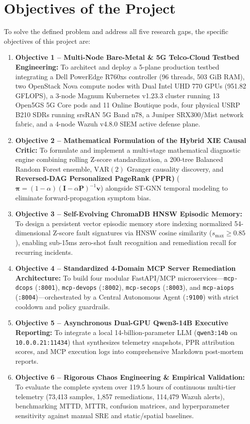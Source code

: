 \section{Objectives of the Project}
To solve the defined problem and address all five research gaps, the specific objectives of this project are:
\begin{enumerate}
    \item \textbf{Objective 1 -- Multi-Node Bare-Metal \& 5G Telco-Cloud Testbed Engineering:} To architect and deploy a 5-plane production testbed integrating a Dell PowerEdge R760xs controller (96 threads, 503 GiB RAM), two OpenStack Nova compute nodes with Dual Intel UHD 770 GPUs (951.82 GFLOPS), a 3-node Magnum Kubernetes v1.23.3 cluster running 13 Open5GS 5G Core pods and 11 Online Boutique pods, four physical USRP B210 SDRs running srsRAN 5G Band n78, a Juniper SRX300/Mist network fabric, and a 4-node Wazuh v4.8.0 SIEM active defense plane.
    \item \textbf{Objective 2 -- Mathematical Formulation of the Hybrid XIE Causal Critic:} To formulate and implement a multi-stage mathematical diagnostic engine combining rolling Z-score standardization, a 200-tree Balanced Random Forest ensemble, $\text{VAR}(2)$ Granger causality discovery, and \textbf{Reversed-DAG Personalized PageRank (PPR)} ($\boldsymbol{\pi} = (1-\alpha)(\mathbf{I}-\alpha\mathbf{P})^{-1}\mathbf{v}$) alongside ST-GNN temporal modeling to eliminate forward-propagation symptom bias.
    \item \textbf{Objective 3 -- Self-Evolving ChromaDB HNSW Episodic Memory:} To design a persistent vector episodic memory store indexing normalized 54-dimensional Z-score fault signatures via HNSW cosine similarity ($s_{\max} \ge 0.85$), enabling sub-15ms zero-shot fault recognition and remediation recall for recurring incidents.
    \item \textbf{Objective 4 -- Standardized 4-Domain MCP Server Remediation Architecture:} To build four modular FastAPI/MCP microservices---\texttt{mcp-dcops} (\texttt{:8001}), \texttt{mcp-devops} (\texttt{:8002}), \texttt{mcp-secops} (\texttt{:8003}), and \texttt{mcp-aiops} (\texttt{:8004})---orchestrated by a Central Autonomous Agent (\texttt{:9100}) with strict cooldown and policy guardrails.
    \item \textbf{Objective 5 -- Asynchronous Dual-GPU Qwen3-14B Executive Reporting:} To integrate a local 14-billion-parameter LLM (\texttt{qwen3:14b} on \texttt{10.0.0.21:11434}) that synthesizes telemetry snapshots, PPR attribution scores, and MCP execution logs into comprehensive Markdown post-mortem reports.
    \item \textbf{Objective 6 -- Rigorous Chaos Engineering \& Empirical Validation:} To evaluate the complete system over 119.5 hours of continuous multi-tier telemetry (73,413 samples, 1,857 remediations, 114,479 Wazuh alerts), benchmarking MTTD, MTTR, confusion matrices, and hyperparameter sensitivity against manual SRE and static/spatial baselines.
\end{enumerate}

